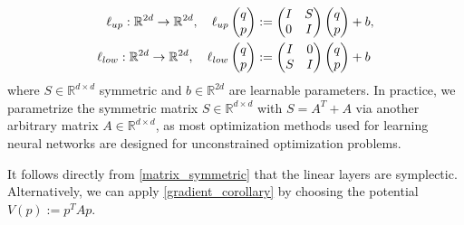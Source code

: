 \documentclass[twoside,a4paper]{article}
\begin{document}
\begin{align*}
	\ell_{up}: \mathbb{R}^{2d} \to \mathbb{R}^{2d}, \quad \ell_{up} \begin{pmatrix} q \\ p \end{pmatrix} &:= \begin{pmatrix}
		I & S \\
		0 & I
	\end{pmatrix} \begin{pmatrix} q \\ p \end{pmatrix} + b, \\
	\ell_{low}: \mathbb{R}^{2d} \to \mathbb{R}^{2d}, \quad \ell_{low} \begin{pmatrix} q \\ p \end{pmatrix} &:= \begin{pmatrix}
		I & 0 \\
		S & I
	\end{pmatrix} \begin{pmatrix} q \\ p \end{pmatrix} + b
\end{align*}
where $S \in \mathbb{R}^{d \times d}$ symmetric and $b \in \mathbb{R}^{2d}$
are learnable parameters. In practice, we parametrize the symmetric matrix $S\in \mathbb{R}^{d \times d}$
with $S = A^T + A$ via another arbitrary matrix $A\in \mathbb{R}^{d \times d}$, as
most optimization methods used for learning neural networks are designed for
unconstrained optimization problems.

It follows directly from \cref{matrix_symmetric} that the linear layers are
symplectic. Alternatively, we can apply \cref{gradient_corollary} by
choosing the potential $V(p) := p^TAp$.
\end{document}
